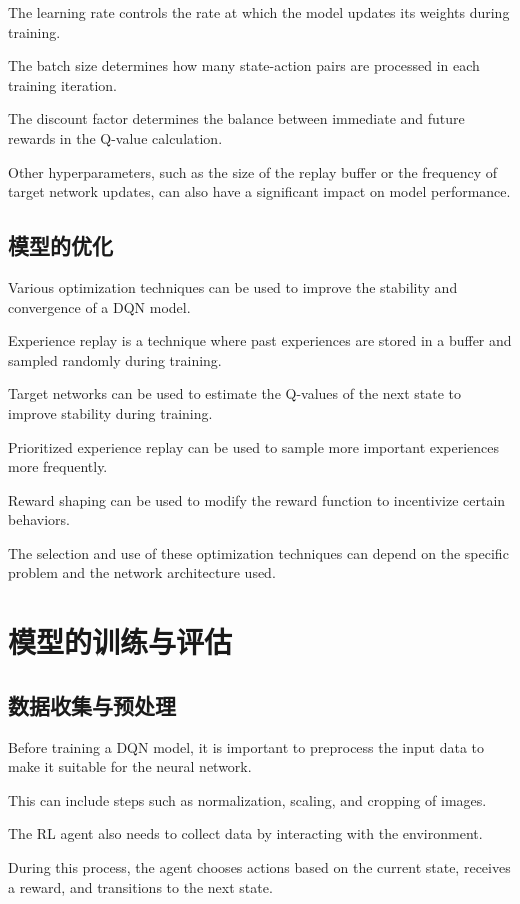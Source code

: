 The learning rate controls the rate at which the model updates its weights during training.

The batch size determines how many state-action pairs are processed in each training iteration.

The discount factor determines the balance between immediate and future rewards in the Q-value calculation.

Other hyperparameters, such as the size of the replay buffer or the frequency of target network updates, can also have a significant impact on model performance.

\subsection{模型的优化}

Various optimization techniques can be used to improve the stability and convergence of a DQN model.

Experience replay is a technique where past experiences are stored in a buffer and sampled randomly during training.

Target networks can be used to estimate the Q-values of the next state to improve stability during training.

Prioritized experience replay can be used to sample more important experiences more frequently.

Reward shaping can be used to modify the reward function to incentivize certain behaviors.

The selection and use of these optimization techniques can depend on the specific problem and the network architecture used.

\section{模型的训练与评估}

\subsection{数据收集与预处理}

Before training a DQN model, it is important to preprocess the input data to make it suitable for the neural network.

This can include steps such as normalization, scaling, and cropping of images.

The RL agent also needs to collect data by interacting with the environment.

During this process, the agent chooses actions based on the current state, receives a reward, and transitions to the next state.

